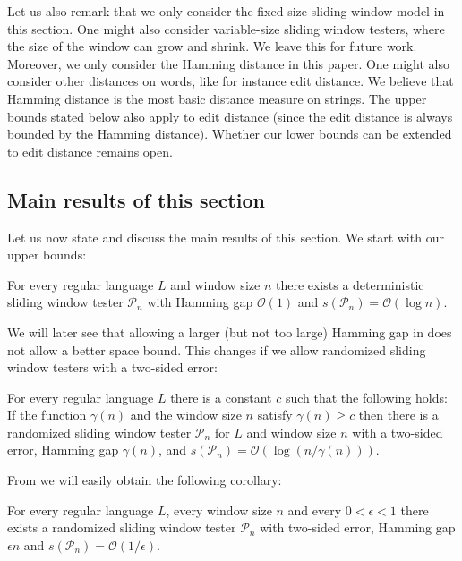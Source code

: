 \documentclass{theoretics}
\renewcommand{\O}{\mathcal{O}}
\renewcommand{\P}{\mathcal{P}}
\renewcommand{\geq}{\geqslant}
\renewcommand{\ge}{\geq}
\begin{document}
Let us also remark that we only consider the fixed-size sliding window model in this section. One might also consider
variable-size sliding window testers, where the size of the window can grow and shrink. 
We leave this for future work. Moreover, we only consider the Hamming distance in this paper.
One might also consider other distances on words, like for instance edit distance. We believe
that Hamming distance is the most basic distance measure on strings. The upper bounds stated below also apply
to edit distance (since the edit distance is always bounded by the Hamming distance). Whether our 
lower bounds can be extended to edit distance remains open.

\subsection{Main results of this section} \label{sec main results testing}

Let us now state and discuss the main results of this section. We start with our upper bounds:

\begin{theorem}
\label{theorem:deterministic_ub}
For every regular language $L$ and window size $n$ there exists a deterministic sliding window tester $\P_n$ 
with Hamming gap $\O(1)$ and $s(\P_n) = \O(\log n)$.
\end{theorem}
We will later see that allowing a larger (but not too large) Hamming gap in  does not allow a better space bound.
This changes if we allow randomized sliding window testers with a two-sided error:

\begin{theorem}
\label{theorem:two-sided-general-HG}
For every regular language $L$ there is a constant $c$ such that the following holds:
If the function $\gamma(n)$ and the window size $n$ satisfy $\gamma(n) \ge c$ then there is a randomized sliding window tester $\P_n$ for $L$ and window size $n$ with a two-sided error,
Hamming gap $\gamma(n)$, and $s(\P_n) = \O(\log(n/\gamma(n)))$.
\end{theorem}
From  we will easily obtain the following corollary:
\begin{corollary}
\label{theorem:two-sided}
For every regular language $L$, every window size $n$ and every $0 < \epsilon < 1$
there exists a randomized sliding window tester $\P_n$
with two-sided error, Hamming gap $\epsilon n$ and $s(\P_n) = \O(1/\epsilon)$.
\end{corollary}
\end{document}
